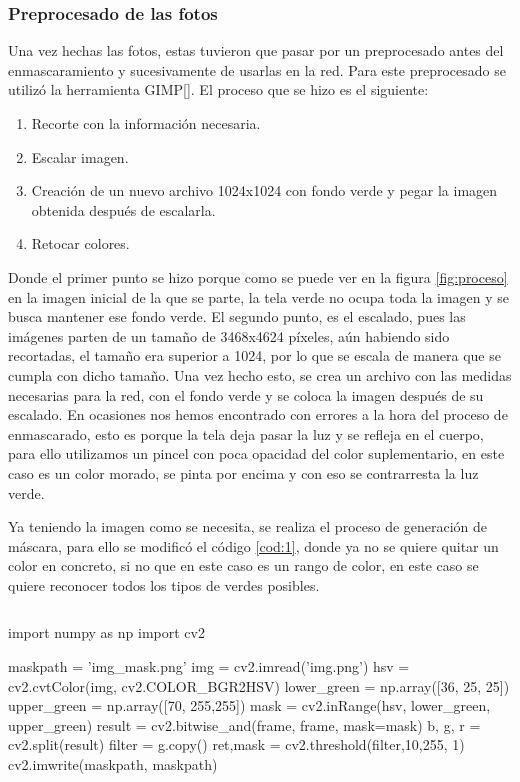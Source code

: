 \subsubsection{Preprocesado de las fotos}
Una vez hechas las fotos, estas tuvieron que pasar por un preprocesado antes del enmascaramiento y sucesivamente de usarlas en la red. Para este preprocesado se utilizó la herramienta GIMP[\cite{gimp}]. 
El proceso que se hizo es el siguiente:
\begin{enumerate}
	\item Recorte con la información necesaria.
	\item Escalar imagen.
	\item Creación de un nuevo archivo 1024x1024 con fondo verde y pegar la imagen obtenida después de escalarla.
	\item Retocar colores.
\end{enumerate}
Donde el primer punto se hizo porque como se puede ver en la figura \ref{fig:proceso} en la imagen inicial de la que se parte, la tela verde no ocupa toda la imagen y se busca mantener ese fondo verde.
El segundo punto, es el escalado, pues las imágenes parten de un tamaño de 3468x4624 píxeles, aún habiendo sido recortadas, el tamaño era superior a 1024, por lo que se escala de manera que se cumpla con dicho tamaño.
Una vez hecho esto, se crea un archivo con las medidas necesarias para la red, con el fondo verde y se coloca la imagen después de su escalado.
En ocasiones nos hemos encontrado con errores a la hora del proceso de enmascarado, esto es porque la tela deja pasar la luz y se refleja en el cuerpo, para ello utilizamos un pincel con poca opacidad del color suplementario, en este caso es un color morado, se pinta por encima y con eso se contrarresta la luz verde.

Ya teniendo la imagen como se necesita, se realiza el proceso de generación de máscara, para ello se modificó el código \ref{cod:1}, donde ya no se quiere quitar un color en concreto, si no que en este caso es un rango de color, en este caso se quiere reconocer todos los tipos de verdes posibles.

\begin{lstlisting}[caption={Código obtención máscara 2}, label=cod:2]
\end{lstlisting}
\begin{python}
	import numpy as np
	import cv2 
	
	maskpath = 'img_mask.png'
	img = cv2.imread('img.png')
	hsv = cv2.cvtColor(img, cv2.COLOR_BGR2HSV)
	lower_green = np.array([36, 25, 25])
	upper_green = np.array([70, 255,255])
	mask = cv2.inRange(hsv, lower_green, upper_green)
	result = cv2.bitwise_and(frame, frame, mask=mask)
	b, g, r = cv2.split(result)
	filter = g.copy()
	ret,mask = cv2.threshold(filter,10,255, 1)
	cv2.imwrite(maskpath, maskpath)
\end{python}
\pagebreak

